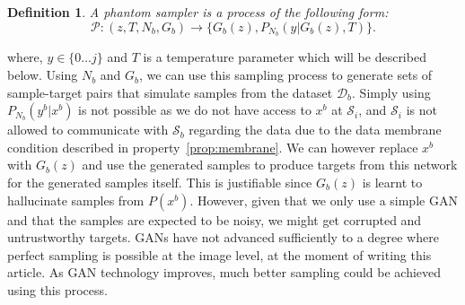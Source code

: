 \documentclass[10pt,twocolumn,letterpaper]{article}
\newtheorem{definition}{Definition}
\def \cS{{\mathcal{S}}}
\def \cD{{\mathcal{D}}}
\begin{document}
	\begin{definition}
		A phantom sampler is a process of the following form:
		\begin{equation}
		\mathcal{P}: (z, T, N_b, G_b) \rightarrow \{G_b(z), P_{N_b}(y \vert G_b(z),T)\}.
		\end{equation}
	\end{definition}
	where, $y \in \{0 \hdots j\}$ and $T$ is a temperature parameter which will be described below.
	Using $N_b$ and $G_b$, we can use this sampling process to generate sets of sample-target pairs that simulate samples from the dataset $\cD_b$. 
	Simply using $P_{N_b}(y^b \vert x^b)$ is not possible as we do not have access to $x^b$ at $\cS_i$, and $\cS_i$ is not allowed to communicate with $\cS_b$ regarding the data due to the data membrane condition described in property~\ref{prop:membrane}.
	We can however replace $x^b$ with $G_b(z)$ and use the generated samples to produce targets from this network for the generated samples itself. 
	This is justifiable since $G_b(z)$ is learnt to hallucinate samples from $P(x^b)$. 
	However, given that we only use a simple GAN and that the samples are expected to be noisy, we might get corrupted and untrustworthy targets. 
	GANs have not advanced sufficiently to a degree where perfect sampling is possible at the image level, at the moment of writing this article.
	As GAN technology improves, much better sampling could be achieved using this process. 
	
\end{document}
